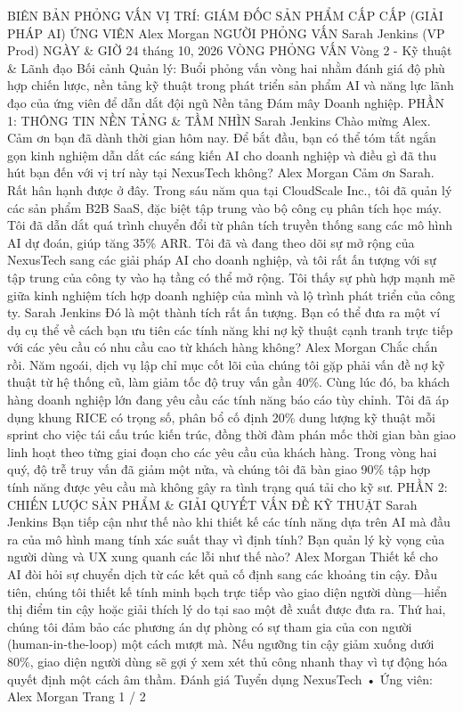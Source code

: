 BIÊN BẢN PHỎNG VẤN
VỊ TRÍ: GIÁM ĐỐC SẢN PHẨM CẤP CẤP (GIẢI PHÁP AI)
ỨNG VIÊN
Alex Morgan
NGƯỜI PHỎNG VẤN
Sarah Jenkins (VP Prod)
NGÀY \& GIỜ
24 tháng 10, 2026
VÒNG PHỎNG VẤN
Vòng 2 - Kỹ thuật \&
Lãnh đạo
Bối cảnh Quản lý: Buổi phỏng vấn vòng hai nhằm đánh giá độ phù hợp chiến lược, nền tảng kỹ thuật trong phát triển sản phẩm AI và năng lực lãnh đạo của ứng viên để dẫn dắt đội ngũ Nền tảng Đám mây Doanh nghiệp.
PHẦN 1: THÔNG TIN NỀN TẢNG \& TẦM NHÌN
Sarah Jenkins
Chào mừng Alex. Cảm ơn bạn đã dành thời gian hôm nay. Để bắt đầu, bạn có thể tóm tắt ngắn gọn kinh nghiệm dẫn dắt các sáng kiến AI cho doanh nghiệp và điều gì đã thu hút bạn đến với vị trí này tại NexusTech không?
Alex Morgan
Cảm ơn Sarah. Rất hân hạnh được ở đây. Trong sáu năm qua tại CloudScale Inc., tôi đã quản lý các sản phẩm B2B SaaS, đặc biệt tập trung vào bộ công cụ phân tích học máy. Tôi đã dẫn dắt quá trình chuyển đổi từ phân tích truyền thống sang các mô hình AI dự đoán, giúp tăng 35\% ARR. Tôi đã và đang theo dõi sự mở rộng của NexusTech sang các giải pháp AI cho doanh nghiệp, và tôi rất ấn tượng với sự tập trung của công ty vào hạ tầng có thể mở rộng. Tôi thấy sự phù hợp mạnh mẽ giữa kinh nghiệm tích hợp doanh nghiệp của mình và lộ trình phát triển của công ty.
Sarah Jenkins
Đó là một thành tích rất ấn tượng. Bạn có thể đưa ra một ví dụ cụ thể về cách bạn ưu tiên các tính năng khi nợ kỹ thuật cạnh tranh trực tiếp với các yêu cầu có nhu cầu cao từ khách hàng không?
Alex Morgan
Chắc chắn rồi. Năm ngoái, dịch vụ lập chỉ mục cốt lõi của chúng tôi gặp phải vấn đề nợ kỹ thuật từ hệ thống cũ, làm giảm tốc độ truy vấn gần 40\%. Cùng lúc đó, ba khách hàng doanh nghiệp lớn đang yêu cầu các tính năng báo cáo tùy chỉnh. Tôi đã áp dụng khung RICE có trọng số, phân bổ cố định 20\% dung lượng kỹ thuật mỗi sprint cho việc tái cấu trúc kiến trúc, đồng thời đàm phán mốc thời gian bàn giao linh hoạt theo từng giai đoạn cho các yêu cầu của khách hàng. Trong vòng hai quý, độ trễ truy vấn đã giảm một nửa, và chúng tôi đã bàn giao 90\% tập hợp tính năng được yêu cầu mà không gây ra tình trạng quá tải cho kỹ sư.
PHẦN 2: CHIẾN LƯỢC SẢN PHẨM \& GIẢI QUYẾT VẤN ĐỀ KỸ THUẬT
Sarah Jenkins
Bạn tiếp cận như thế nào khi thiết kế các tính năng dựa trên AI mà đầu ra của mô hình mang tính xác suất thay vì định tính? Bạn quản lý kỳ vọng của người dùng và UX xung quanh các lỗi như thế nào?
Alex Morgan
Thiết kế cho AI đòi hỏi sự chuyển dịch từ các kết quả cố định sang các khoảng tin cậy. Đầu tiên, chúng tôi thiết kế tính minh bạch trực tiếp vào giao diện người dùng—hiển thị điểm tin cậy hoặc giải thích lý do tại sao một đề xuất được đưa ra. Thứ hai, chúng tôi đảm bảo các phương án dự phòng có sự tham gia của con người (human-in-the-loop) một cách mượt mà. Nếu ngưỡng tin cậy giảm xuống dưới 80\%, giao diện người dùng sẽ gợi ý xem xét thủ công nhanh thay vì tự động hóa quyết định một cách âm thầm.
Đánh giá Tuyển dụng NexusTech • Ứng viên: Alex Morgan
Trang 1 / 2

